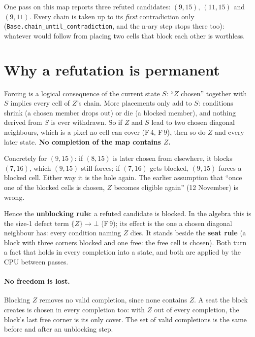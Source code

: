 \documentclass[10pt,a4paper]{article}
\newcommand{\code}[1]{\texttt{#1}}
\newcommand{\T}[1]{\ensuremath{\{#1\}}}
\begin{document}
One pass on this map reports three refuted candidates: $(9,15)$, $(11,15)$ and $(9,11)$. Every chain is taken up to its \emph{first} contradiction only (\code{Base.chain\_until\_contradiction}, and the n-ary step stops there too): whatever would follow from placing two cells that block each other is worthless.

\section{Why a refutation is permanent}

Forcing is a logical consequence of the current state $S$: ``$Z$ chosen'' together with $S$ implies every cell of $Z$'s chain. More placements only add to $S$: conditions shrink (a chosen member drops out) or die (a blocked member), and nothing derived from $S$ is ever withdrawn. So if $Z$ and $S$ lead to two chosen diagonal neighbours, which is a pixel no cell can cover (F\,4, F\,9), then so do $Z$ and every later state. \textbf{No completion of the map contains $Z$.}

Concretely for $(9,15)$: if $(8,15)$ is later chosen from elsewhere, it blocks $(7,16)$, which $(9,15)$ still forces; if $(7,16)$ gets blocked, $(9,15)$ forces a blocked cell. Either way it is the hole again. The earlier assumption that ``once one of the blocked cells is chosen, $Z$ becomes eligible again'' (12 November) is wrong.

Hence the \textbf{unblocking rule}: a refuted candidate is blocked. In the algebra this is the size-1 defect term $\T{Z}\to\bot$ (F\,9); its effect is the one a chosen diagonal neighbour has: every condition naming $Z$ dies. It stands beside the \textbf{seat rule} (a block with three corners blocked and one free: the free cell is chosen). Both turn a fact that holds in every completion into a state, and both are applied by the CPU between passes.

\paragraph{No freedom is lost.} Blocking $Z$ removes no valid completion, since none contains $Z$. A seat the block creates is chosen in every completion too: with $Z$ out of every completion, the block's last free corner is its only cover. The set of valid completions is the same before and after an unblocking step.

\end{document}
